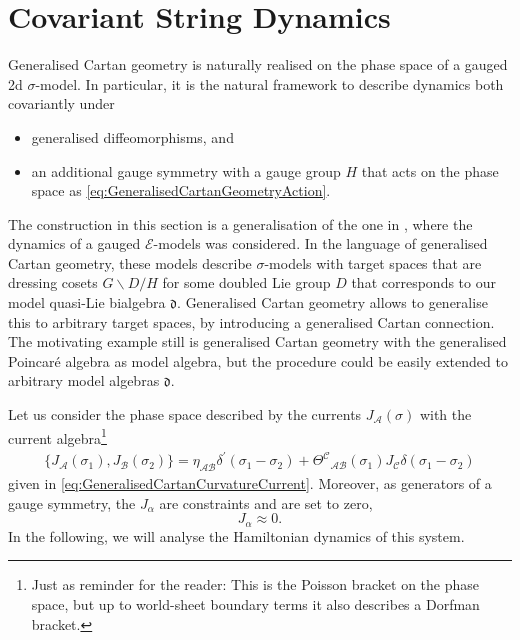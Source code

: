 \documentclass[11pt,a4paper]{article}
\numberwithin{equation}{section}
\begin{document}
\section{Covariant String Dynamics} \label{chap:CovariantStringDynamics}
Generalised Cartan geometry is naturally realised on the phase space of a gauged 2d $\sigma$-model. In particular, it is the natural framework to describe dynamics both covariantly under
\begin{itemize}
    \item generalised diffeomorphisms, and
    \item an additional gauge symmetry with a gauge group $H$ that acts on the phase space as \eqref{eq:GeneralisedCartanGeometryAction}.
\end{itemize}
The construction in this section is a generalisation of the one in \cite{Lacroix:2023ybi}, where the dynamics of a gauged $\mathcal{E}$-models was considered. In the language of generalised Cartan geometry, these models describe $\sigma$-models with target spaces that are dressing cosets \cite{Klimcik:1996np} $G \backslash D / H$ for some doubled Lie group $D$ that corresponds to our model quasi-Lie bialgebra $\mathfrak{d}$. Generalised Cartan geometry allows to generalise this to arbitrary target spaces, by introducing a generalised Cartan connection. The motivating example still is generalised Cartan geometry with the generalised Poincar\'e algebra as model algebra, but the procedure could be easily extended to arbitrary model algebras $\mathfrak{d}$.

Let us consider the phase space described by the currents $J_\mathcal{A} (\sigma)$ with the current algebra\footnote{Just as reminder for the reader: This is the Poisson bracket on the phase space, but up to world-sheet boundary terms it also describes a Dorfman bracket.}
\begin{align*}
    \{ J_\mathcal{A}(\sigma_1) , J_\mathcal{B}(\sigma_2) \} = \eta_{\mathcal{AB}} \delta^\prime(\sigma_1 - \sigma_2) + {\Theta^\mathcal{C}}_{\mathcal{AB}}(\sigma_1) J_\mathcal{C}\delta(\sigma_1 - \sigma_2)
\end{align*}
given in \eqref{eq:GeneralisedCartanCurvatureCurrent}. Moreover, as generators of a gauge symmetry, the $J_\alpha$ are constraints and are set to zero,
\begin{equation}
	J_\alpha \approx 0.
\end{equation}
In the following, we will analyse the Hamiltonian dynamics of this system.
\end{document}
